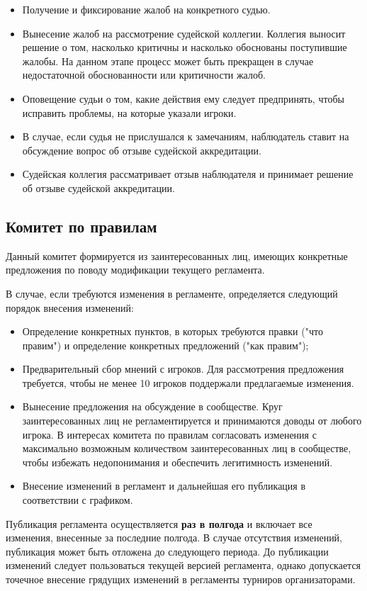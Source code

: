 \begin{itemize}
	\item Получение и фиксирование жалоб на конкретного судью.
	\item Вынесение жалоб на рассмотрение судейской коллегии. Коллегия выносит решение о том, насколько критичны и насколько обоснованы поступившие жалобы. На данном этапе процесс может быть прекращен в случае недостаточной обоснованности или критичности жалоб.
	\item Оповещение судьи о том, какие действия ему следует предпринять, чтобы исправить проблемы, на которые указали игроки.
	\item В случае, если судья не прислушался к замечаниям, наблюдатель ставит на обсуждение вопрос об отзыве судейской аккредитации.
	\item Судейская коллегия рассматривает отзыв наблюдателя и принимает решение об отзыве судейской аккредитации.
\end{itemize}

\subsection{Комитет по правилам}

Данный комитет формируется из заинтересованных лиц, имеющих конкретные предложения по поводу модификации текущего регламента.

В случае, если требуются изменения в регламенте, определяется следующий порядок внесения изменений:
\begin{itemize}
	\item Определение конкретных пунктов, в которых требуются правки ("что правим") и определение конкретных предложений ("как правим");
	\item Предварительный сбор мнений с игроков. Для рассмотрения предложения требуется, чтобы не менее 10 игроков поддержали предлагаемые изменения.
	\item Вынесение предложения на обсуждение в сообществе. Круг заинтересованных лиц не регламентируется и принимаются доводы от любого игрока. В интересах комитета по правилам согласовать изменения с максимально возможным количеством заинтересованных лиц в сообществе, чтобы избежать недопонимания и обеспечить легитимность изменений.
	\item Внесение изменений в регламент и дальнейшая его публикация в соответствии с графиком.
\end{itemize}

Публикация регламента осуществляется \textbf{раз в полгода} и включает все изменения, внесенные за последние полгода. В случае отсутствия изменений, публикация может быть отложена до следующего периода. До публикации изменений следует пользоваться текущей версией регламента, однако допускается точечное внесение грядущих изменений в регламенты турниров организаторами.

